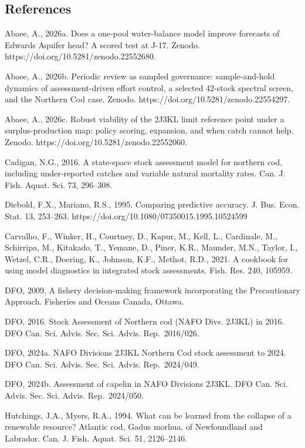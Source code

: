 \documentclass[11pt]{article}
\begin{document}
\subsection{References}\label{references}

Abaee, A., 2026a. Does a one-pool water-balance model improve forecasts
of Edwards Aquifer head? A scored test at J-17. Zenodo.
https://doi.org/10.5281/zenodo.22552680.

Abaee, A., 2026b. Periodic review as sampled governance: sample-and-hold
dynamics of assessment-driven effort control, a selected 42-stock
spectral screen, and the Northern Cod case. Zenodo.
https://doi.org/10.5281/zenodo.22554297.

Abaee, A., 2026c. Robust viability of the 2J3KL limit reference point
under a surplus-production map: policy scoring, expansion, and when
catch cannot help. Zenodo. https://doi.org/10.5281/zenodo.22552060.

Cadigan, N.G., 2016. A state-space stock assessment model for northern
cod, including under-reported catches and variable natural mortality
rates. Can. J. Fish. Aquat. Sci. 73, 296--308.

Diebold, F.X., Mariano, R.S., 1995. Comparing predictive accuracy. J.
Bus. Econ. Stat. 13, 253--263.
https://doi.org/10.1080/07350015.1995.10524599

Carvalho, F., Winker, H., Courtney, D., Kapur, M., Kell, L., Cardinale,
M., Schirripa, M., Kitakado, T., Yemane, D., Piner, K.R., Maunder, M.N.,
Taylor, I., Wetzel, C.R., Doering, K., Johnson, K.F., Methot, R.D.,
2021. A cookbook for using model diagnostics in integrated stock
assessments. Fish. Res. 240, 105959.

DFO, 2009. A fishery decision-making framework incorporating the
Precautionary Approach. Fisheries and Oceans Canada, Ottawa.

DFO, 2016. Stock Assessment of Northern cod (NAFO Divs. 2J3KL) in 2016.
DFO Can. Sci. Advis. Sec. Sci. Advis. Rep.~2016/026.

DFO, 2024a. NAFO Divisions 2J3KL Northern Cod stock assessment to 2024.
DFO Can. Sci. Advis. Sec. Sci. Advis. Rep.~2024/049.

DFO, 2024b. Assessment of capelin in NAFO Divisions 2J3KL. DFO Can. Sci.
Advis. Sec. Sci. Advis. Rep.~2024/050.

Hutchings, J.A., Myers, R.A., 1994. What can be learned from the
collapse of a renewable resource? Atlantic cod, Gadus morhua, of
Newfoundland and Labrador. Can. J. Fish. Aquat. Sci. 51, 2126--2146.
\end{document}
